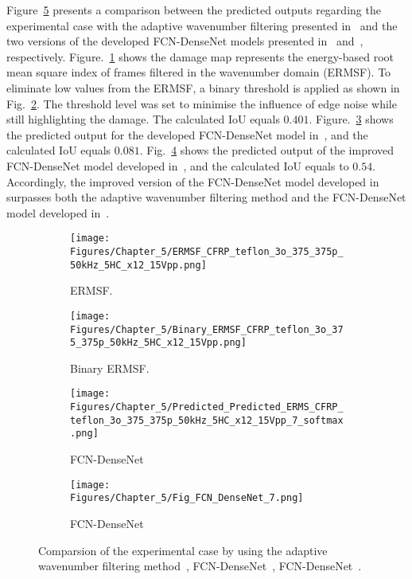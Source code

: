 Figure~\ref{fig:exp_erms_case_comp} presents a comparison between the predicted outputs regarding the experi\-mental case with the adaptive wavenumber filtering presented in~\cite{Kudela2015, Radzienski2019} and the two versions of the developed FCN-DenseNet models presented in~\cite{Ijjeh2021} and~\cite{Ijjeh2022}, respectively.
Figure.~\ref{fig:ERMSF} shows the damage map represents the energy-based root mean square index of frames filtered in the wavenumber domain (ERMSF).
To eliminate low values from the ERMSF, a binary threshold is applied as shown in Fig.~\ref{fig:Binary_ERMSF}.
The threshold level was set to minimise the influence of edge noise while still highlighting the damage.
The calculated IoU equals $0.401$.
Figure.~\ref{fig:FCN_densenet_2021} shows the predicted output for the developed FCN-DenseNet model in~\cite{Ijjeh2021}, and the calculated IoU equals $0.081$. 
Fig.~\ref{fig:FCN_densenet_2022} shows the predicted output of the improved FCN-DenseNet model developed in~\cite{Ijjeh2022}, and the calculated IoU equals to $0.54$.
Accordingly, the improved version of the FCN-DenseNet model developed in~\cite{Ijjeh2022} surpasses both the adaptive wavenumber filtering method and the FCN-DenseNet model developed in~\cite{Ijjeh2021}.
\begin{figure} [!h]
	\centering
	\begin{subfigure}[b]{.48\textwidth}
		\centering
		\texttt{[image: Figures/Chapter\_5/ERMSF\_CFRP\_teflon\_3o\_375\_375p\_50kHz\_5HC\_x12\_15Vpp.png]}
		\caption{ERMSF.}
		\label{fig:ERMSF}
	\end{subfigure}
	\hfill
	\begin{subfigure}[b]{.48\textwidth}
		\centering
		\texttt{[image: Figures/Chapter\_5/Binary\_ERMSF\_CFRP\_teflon\_3o\_375\_375p\_50kHz\_5HC\_x12\_15Vpp.png]}
		\caption{Binary ERMSF.}
		\label{fig:Binary_ERMSF}	
	\end{subfigure}
	\hfill
	\begin{subfigure}[b]{.48\textwidth}
		\centering
		\texttt{[image: Figures/Chapter\_5/Predicted\_Predicted\_ERMS\_CFRP\_teflon\_3o\_375\_375p\_50kHz\_5HC\_x12\_15Vpp\_7\_softmax.png]}
		\caption{FCN-DenseNet~\cite{Ijjeh2021}}
		\label{fig:FCN_densenet_2021}
	\end{subfigure}
	\hfill
	\begin{subfigure}[b]{.48\textwidth}
		\centering
		\texttt{[image: Figures/Chapter\_5/Fig\_FCN\_DenseNet\_7.png]}
		\caption{FCN-DenseNet~\cite{Ijjeh2022}}
		\label{fig:FCN_densenet_2022}	
	\end{subfigure}
	\caption{Comparsion of the experimental case by using the adaptive wavenumber filtering method~\cite{}, FCN-DenseNet~\cite{Ijjeh2021}, FCN-DenseNet~\cite{Ijjeh2022}.}
	\label{fig:exp_erms_case_comp}
\end{figure}

